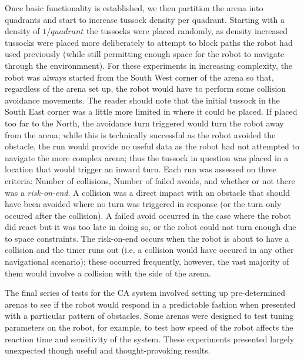 \documentclass[a4paper,12pt]{article}
\begin{document}
Once basic functionality is established, we then partition the arena into quadrants and start to increase tussock density per quadrant.
Starting with a density of $1/\textit{quadrant}$ the tussocks were placed randomly, as density increased tussocks were placed more
deliberately to attempt to block paths the robot had used previously (while still permitting enough space for the robot to navigate
through the environmnent). For these experiments in increasing complexity, the robot was always started from the South West corner
of the arena so that, regardless of the arena set up, the robot would have to perform some collision avoidance movements. The reader
should note that the initial tussock in the South East corner was a little more limited in where it could be placed. If placed too
far to the North, the avoidance turn triggered would turn the robot away from the arena; while this is technically successful as the
robot avoided the obstacle, the run would provide no useful data as the robot had not attempted to navigate the more complex arena; thus
the tussock in question was placed in a location that would trigger an inward turn. Each run was assessed on three criteria: Number of collisions,
Number of failed avoids, and whether or not there was a \textit{risk-on-end}. A collision was a direct impact with an obstacle that
should have been avoided where no turn was triggered in response (or the turn only occured after the collision). A failed avoid occurred in
the case where the robot did react but it was too late in doing so, or the robot could not turn enough due to space constraints. The
risk-on-end occurs when the robot is about to have a collision and the timer runs out (i.e. a collision would have occured in any other
navigational scenario); these occurred frequently, however, the vast majority of them would involve a collision with the side of the arena.
\newline

The final series of tests for the CA system involved setting up pre-determined arenas to see if the robot would respond in a predictable
fashion when presented with a particular pattern of obstacles. Some arenas were designed to test tuning parameters on the robot, for example,
to test how speed of the robot affects the reaction time and sensitivity of the system. These experiments presented largely unexpected though
useful and thought-provoking results.
\newline
\end{document}
